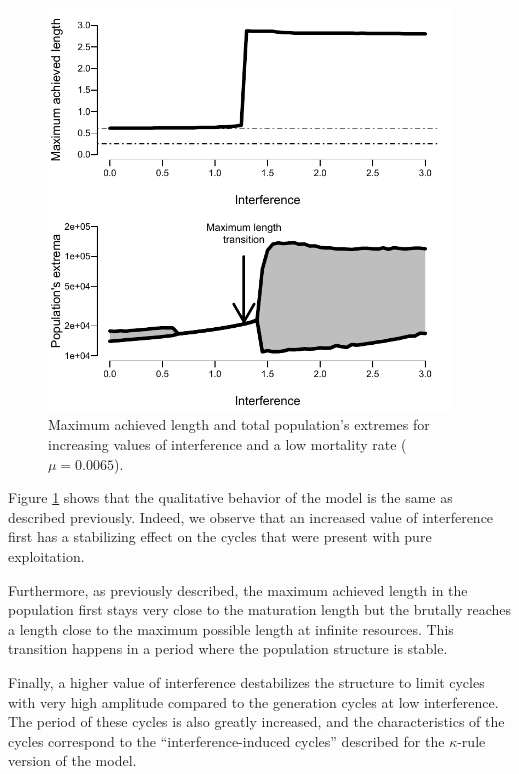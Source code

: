\begin{figure}[!ht] %
\centering
\includegraphics[width=0.95\textwidth]{4_ChapThe1/Fig/FigSM8}
\caption[Bifurcation over interference
(net production model)]{Maximum achieved length and total population's extremes
for increasing values of interference and a low mortality rate ($\mu=0.0065$).}
\label{Fig4-SM8}
\end{figure}

Figure \ref{Fig4-SM8} shows that the qualitative behavior of the model is the
same as described previously. Indeed, we observe that an increased value of interference
first has a stabilizing effect on the cycles that were present with pure
exploitation.

Furthermore, as previously described, the maximum achieved length in the
population first stays very close to the maturation length but the brutally
reaches a length close to the maximum possible length at infinite resources.
This transition happens in a period where the population structure is stable.

Finally, a higher value of interference destabilizes the structure to limit
cycles with very high amplitude compared to the generation cycles at low
interference. The period of these cycles is also greatly increased, and the
characteristics of the cycles correspond to the “interference-induced cycles”
described for the $\kappa$-rule version of the model.


